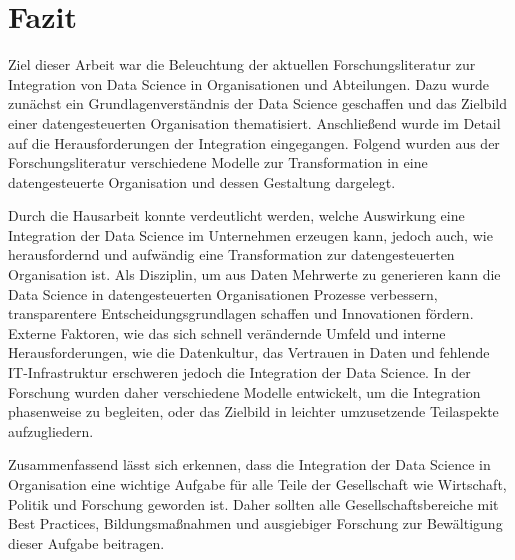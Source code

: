 \chapter[Fazit]{Fazit}
Ziel dieser Arbeit war die Beleuchtung der aktuellen Forschungsliteratur zur Integration von Data Science in Organisationen und Abteilungen.
Dazu wurde zunächst ein Grundlagenverständnis der Data Science geschaffen und das Zielbild einer datengesteuerten Organisation thematisiert.
Anschließend wurde im Detail auf die Herausforderungen der Integration eingegangen.
Folgend wurden aus der Forschungsliteratur verschiedene Modelle zur Transformation in eine datengesteuerte Organisation und dessen Gestaltung dargelegt.

Durch die Hausarbeit konnte verdeutlicht werden, welche Auswirkung eine Integration der Data Science im Unternehmen erzeugen kann, jedoch auch, wie herausfordernd und aufwändig eine Transformation zur datengesteuerten Organisation ist.
Als Disziplin, um aus Daten Mehrwerte zu generieren kann die Data Science in datengesteuerten Organisationen Prozesse verbessern, transparentere Entscheidungsgrundlagen schaffen und Innovationen fördern.
Externe Faktoren, wie das sich schnell verändernde Umfeld und interne Herausforderungen, wie die Datenkultur, das Vertrauen in Daten und fehlende IT-Infrastruktur erschweren jedoch die Integration der Data Science.
In der Forschung wurden daher verschiedene Modelle entwickelt, um die Integration phasenweise zu begleiten, oder das Zielbild in leichter umzusetzende Teilaspekte aufzugliedern. 

Zusammenfassend lässt sich erkennen, dass die Integration der Data Science in Organisation eine wichtige Aufgabe für alle Teile der Gesellschaft wie Wirtschaft, Politik und Forschung geworden ist.
Daher sollten alle Gesellschaftsbereiche mit Best Practices, Bildungsmaßnahmen und ausgiebiger Forschung zur Bewältigung dieser Aufgabe beitragen.
